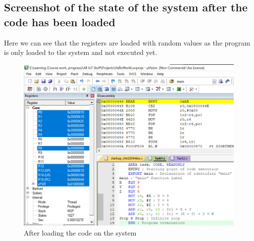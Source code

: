 \documentclass[footheight=20pt, footsepline, headheight=20pt, headsepline]{scrartcl}
\begin{document}
\subsection*{Screenshot of the state of the system after the code has been loaded}
Here we can see that the registers are loaded with random values as the program is only loaded to the system and not executed yet.
\begin{figure}[ht]
    \centering
    \includegraphics[scale=.8]{images/Task1Before1.jpg}
    \caption{After loading the code on the system}
    \label{fig:before_task_one}
\end{figure}
\FloatBarrier
\end{document}
